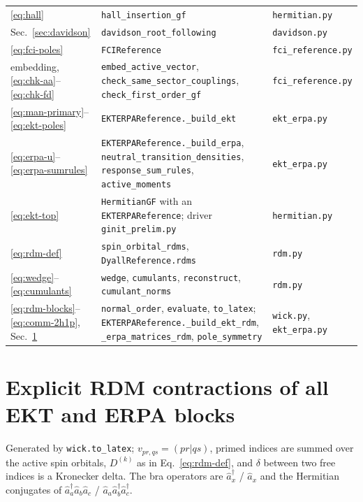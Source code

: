 \documentclass[11pt,a4paper]{article}
\newcommand{\code}[1]{\texttt{#1}}
\begin{document}
\begin{center}
\begin{tabular}{>{\raggedright\arraybackslash}p{4.0cm}>{\raggedright\arraybackslash}p{6.5cm}>{\raggedright\arraybackslash}p{4.5cm}}
\eqref{eq:hall} & \code{hall\_insertion\_gf} & \code{hermitian.py}\\
Sec.~\ref{sec:davidson} & \code{davidson\_root\_following} & \code{davidson.py}\\
\eqref{eq:fci-poles} & \code{FCIReference} & \code{fci\_reference.py}\\
embedding, \eqref{eq:chk-aa}--\eqref{eq:chk-fd} & \code{embed\_active\_vector}, \code{check\_same\_sector\_couplings}, \code{check\_first\_order\_gf} & \code{fci\_reference.py}\\
\eqref{eq:man-primary}--\eqref{eq:ekt-poles} & \code{EKTERPAReference.\_build\_ekt} & \code{ekt\_erpa.py}\\
\eqref{eq:erpa-u}--\eqref{eq:erpa-sumrules} & \code{EKTERPAReference.\_build\_erpa}, \code{neutral\_transition\_densities}, \code{response\_sum\_rules}, \code{active\_moments} & \code{ekt\_erpa.py}\\
\eqref{eq:ekt-top} & \code{HermitianGF} with an \code{EKTERPAReference}; driver \code{ginit\_prelim.py} & \code{hermitian.py}\\
\eqref{eq:rdm-def} & \code{spin\_orbital\_rdms}, \code{DyallReference.rdms} & \code{rdm.py}\\
\eqref{eq:wedge}--\eqref{eq:cumulants} & \code{wedge}, \code{cumulants}, \code{reconstruct}, \code{cumulant\_norms} & \code{rdm.py}\\
\eqref{eq:rdm-blocks}--\eqref{eq:comm-2h1p}, Sec.~\ref{sec:rdm-terms} & \code{normal\_order}, \code{evaluate}, \code{to\_latex}; \code{EKTERPAReference.\_build\_ekt\_rdm}, \code{\_erpa\_matrices\_rdm}, \code{pole\_symmetry} & \code{wick.py}, \code{ekt\_erpa.py}\\
\bottomrule
\end{tabular}
\end{center}

\section{Explicit RDM contractions of all EKT and ERPA blocks}
\label{sec:rdm-terms}

Generated by \code{wick.to\_latex}; $v_{pr,qs}=(pr|qs)$, primed indices are
summed over the active spin orbitals, $D^{(k)}$ as in Eq.~\eqref{eq:rdm-def},
and $\delta$ between two free indices is a Kronecker delta.  The bra
operators are $\hat a_x^\dagger$ / $\hat a_x$ and the Hermitian conjugates of
$\hat a_a^\dagger\hat a_b\hat a_c$ / $\hat a_a\hat a_b^\dagger\hat a_c^\dagger$.
{\small\allowdisplaybreaks

}
\end{document}
